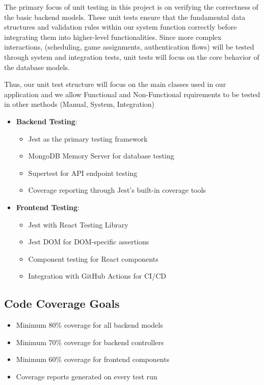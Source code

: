\documentclass[12pt, titlepage]{article}
\begin{document}
The primary focus of unit testing in this project is on verifying the correctness of the basic backend models. These unit tests ensure that the fundamental data structures and validation rules within our system function correctly before integrating them into higher-level functionalities. Since more complex interactions, (scheduling, game assignments, authentication flows) will be tested through system and integration tests, unit tests will focus on the core behavior of the database models.

Thus, our unit test structure will focus on the main classes used in our application and we allow Functional and Non-Functional rquirements to be tested in other methods (Manual, System, Integration)

\begin{itemize}
    \item \textbf{Backend Testing}:
    \begin{itemize}
        \item Jest as the primary testing framework
        \item MongoDB Memory Server for database testing
        \item Supertest for API endpoint testing
        \item Coverage reporting through Jest's built-in coverage tools
    \end{itemize}
    
    \item \textbf{Frontend Testing}:
    \begin{itemize}
        \item Jest with React Testing Library
        \item Jest DOM for DOM-specific assertions
        \item Component testing for React components
        \item Integration with GitHub Actions for CI/CD
    \end{itemize}
\end{itemize}

\subsection{Code Coverage Goals}

\begin{itemize}
    \item Minimum 80\% coverage for all backend models
    \item Minimum 70\% coverage for backend controllers
    \item Minimum 60\% coverage for frontend components
    \item Coverage reports generated on every test run
\end{itemize}
\end{document}
